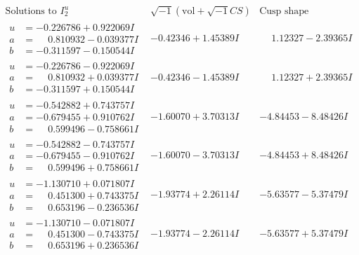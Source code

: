 \documentclass[1p]{elsarticle_modified}
\theoremstyle{definition}
\newcommand{\I}{\sqrt{-1}}
\begin{document}
$$\begin{array}{c|c|c}  
\text{Solutions to }I^u_{2}& \I (\text{vol} + \sqrt{-1}CS) & \text{Cusp shape}\\
 \hline 
\begin{aligned}
u &= -0.226786 + 0.922069 I \\
a &= \phantom{-}0.810932 - 0.039377 I \\
b &= -0.311597 - 0.150544 I\end{aligned}
 & -0.42346 + 1.45389 I & \phantom{-}1.12327 - 2.39365 I \\ \hline\begin{aligned}
u &= -0.226786 - 0.922069 I \\
a &= \phantom{-}0.810932 + 0.039377 I \\
b &= -0.311597 + 0.150544 I\end{aligned}
 & -0.42346 - 1.45389 I & \phantom{-}1.12327 + 2.39365 I \\ \hline\begin{aligned}
u &= -0.542882 + 0.743757 I \\
a &= -0.679455 + 0.910762 I \\
b &= \phantom{-}0.599496 - 0.758661 I\end{aligned}
 & -1.60070 + 3.70313 I & -4.84453 - 8.48426 I \\ \hline\begin{aligned}
u &= -0.542882 - 0.743757 I \\
a &= -0.679455 - 0.910762 I \\
b &= \phantom{-}0.599496 + 0.758661 I\end{aligned}
 & -1.60070 - 3.70313 I & -4.84453 + 8.48426 I \\ \hline\begin{aligned}
u &= -1.130710 + 0.071807 I \\
a &= \phantom{-}0.451300 + 0.743375 I \\
b &= \phantom{-}0.653196 - 0.236536 I\end{aligned}
 & -1.93774 + 2.26114 I & -5.63577 - 5.37479 I \\ \hline\begin{aligned}
u &= -1.130710 - 0.071807 I \\
a &= \phantom{-}0.451300 - 0.743375 I \\
b &= \phantom{-}0.653196 + 0.236536 I\end{aligned}
 & -1.93774 - 2.26114 I & -5.63577 + 5.37479 I \\ \hline\begin{aligned}

\end{aligned}
\end{array}$$
\end{document}
